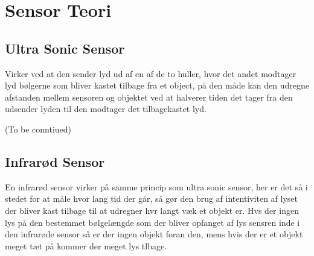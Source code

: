 \chapter{Sensor Teori}
\section{Ultra Sonic Sensor}
Virker ved at den sender lyd ud af en af de to huller, hvor det andet modtager
lyd bølgerne som bliver kastet tilbage fra et object, på den måde kan den
udregne afstanden mellem sensoren og objektet ved at halverer tiden det tager
fra den udsender lyden til den modtager det tilbagekastet lyd.

(To be conntiued)

\section{Infrarød Sensor}
En infrarød sensor virker på samme princip som ultra sonic sensor, her er det så
i stedet for at måle hvor lang tid der går, så gør den brug af intentiviten af
lyset der bliver kast tilbage til at udregner hvr langt væk et objekt er. Hvs
der ingen lys på den bestemmet bølgelængde som der bliver opfanget af lys
sensren inde i den infrarøde sensor så er der ingen objekt foran den, mens hvis
der er et objekt meget tæt på kommer der meget lys tlbage. 











